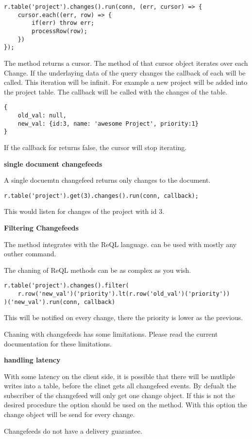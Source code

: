 \begin{lstlisting}[frame=single, caption=example usage, label=refdoc]
r.table('project').changes().run(conn, (err, cursor) => {
	cursor.each((err, row) => {
		if(err) throw err;
		processRow(row);
	})
});
\end{lstlisting}

The  method returns a cursor.
The  method of that cursor object iterates over each Change.
If the underlaying data of the query changes the callback of each will be called.
This iteration will be infinit.
For example a new project will be added  into the project table.
The  callback will be called with the changes of the table.

\begin{lstlisting}[frame=single, caption=example usage, label=refdoc]
{
	old_val: null,
	new_val: {id:3, name: 'awesome Project', priority:1}
}
\end{lstlisting}

If the callback for  returns false, the cursor will stop iterating.

\textbf{single document changefeeds}

A single docuemtn changefeed returns only changes to the document.

\begin{lstlisting}[frame=single, caption=example usage, label=refdoc]
r.table('project').get(3).changes().run(conn, callback);
\end{lstlisting}

This would listen for changes of the project with id 3.

\textbf{Filtering Changefeeds}

The method  integrates with the ReQL language.
 can be used with mostly any outher command.

The chaning of ReQL methods can be as complex as you wish.

\begin{lstlisting}[frame=single, caption=example usage, label=refdoc]
r.table('project').changes().filter(
    r.row('new_val')('priority').lt(r.row('old_val')('priority'))
)('new_val').run(conn, callback)
\end{lstlisting}

This will be notified on every change, there the priority is lower as the previous.

Chaning with changefeeds has some limitations.
Please read the current documentation for these limitations.

\textbf{handling latency}

With some latency on the client side, it is possible that there will be mutliple writes into a table, before the clinet gets all changefeed events.
By defualt the subscriber of the changefeed will only get one change object.
If this is not the desired procedure the option  should be used on the  method.
With this option the change object will be send for every change.

Changefeeds do not have a delivery guarantee.

